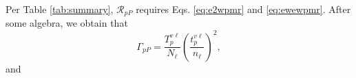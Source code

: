 \documentclass[aps,prb,10pt,showpacs,letterpaper,twocolumn]{revtex4-1}
\begin{document}
Per Table \ref{tab:summary}, $\mathcal{R}_{pP}$ requires Eqs. \eqref{eq:e2wpmr}
and \eqref{eq:ewewpmr}. After some algebra, we obtain that
\begin{equation}\label{eq:mc78}
\Gamma_{pP} =
\frac{T^{v\ell}_{p}}{N_{\ell}}
\left(\frac{t^{v\ell}_{p}}{n_{\ell}}\right)^{2}
,
\end{equation}
and
\end{document}
